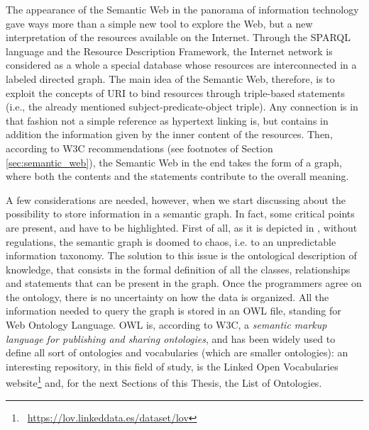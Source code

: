The appearance of the Semantic Web in the panorama of information technology gave ways more than a simple new tool to explore the Web, but a new interpretation of the resources available on the Internet. Through the SPARQL language and the Resource Description Framework, the Internet network is considered as a whole a special database whose resources are interconnected in a labeled directed graph. The main idea of the Semantic Web, therefore, is to exploit the concepts of URI to bind resources through triple-based statements (i.e., the already mentioned subject-predicate-object triple). Any connection is in that fashion not a simple reference as hypertext linking is, but contains in addition the information given by the inner content of the resources. Then, according to W3C recommendations (see footnotes of Section \ref{sec:semantic_web}), the Semantic Web in the end takes the form of a graph, where both the contents and the statements contribute to the overall meaning. 

A few considerations are needed, however, when we start discussing about the possibility to store information in a semantic graph. In fact, some critical points are present, and have to be highlighted. First of all, as it is depicted in \cite{noy2005order}, without regulations, the semantic graph is doomed to chaos, i.e. to an unpredictable information taxonomy. The solution to this issue is the ontological description of knowledge, that consists in the formal definition of all the classes, relationships and statements that can be present in the graph. Once the programmers agree on the ontology, there is no uncertainty on how the data is organized. All the information needed to query the graph is stored in an OWL file, standing for Web Ontology Language. OWL is, according to W3C, a \textit{semantic markup language for publishing and sharing ontologies}, and has been widely used to define all sort of ontologies and vocabularies (which are smaller ontologies): an interesting repository, in this field of study, is the Linked Open Vocabularies website\footnote{\faLink~\url{https://lov.linkeddata.es/dataset/lov}} and, for the next Sections of this Thesis, the List of Ontologies.

